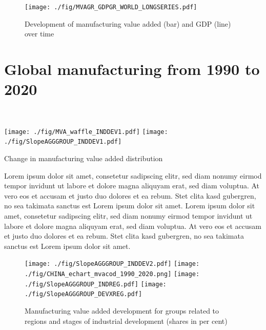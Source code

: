 \documentclass[
  openany, nofonts]{tufte-book}
\begin{document}
\vspace*{\fill}

\begin{figure}
\texttt{[image: ./fig/MVAGR\_GDPGR\_WORLD\_LONGSERIES.pdf]} \caption[Development of MVA (bar) and GDP (line) over time]{Development of manufacturing value added (bar) and GDP (line) over time}\label{fig:c02-LONGSERIES}
\end{figure}

\clearpage\pagebreak

\hypertarget{global-manufacturing-from-1990-to-2020}{%
\section{Global manufacturing from 1990 to 2020}\label{global-manufacturing-from-1990-to-2020}}

~

\begin{marginfigure}
\texttt{[image: ./fig/MVA\_waffle\_INDDEV1.pdf]} \texttt{[image: ./fig/SlopeAGGGROUP\_INDDEV1.pdf]} \caption[Change in MVA distribution]{Change in manufacturing value added distribution}\label{fig:c02-mvadist}
\end{marginfigure}

Lorem ipsum dolor sit amet, consetetur sadipscing elitr, sed diam nonumy eirmod tempor invidunt ut labore et dolore magna aliquyam erat, sed diam voluptua. At vero eos et accusam et justo duo dolores et ea rebum. Stet clita kasd gubergren, no sea takimata sanctus est Lorem ipsum dolor sit amet. Lorem ipsum dolor sit amet, consetetur sadipscing elitr, sed diam nonumy eirmod tempor invidunt ut labore et dolore magna aliquyam erat, sed diam voluptua. At vero eos et accusam et justo duo dolores et ea rebum. Stet clita kasd gubergren, no sea takimata sanctus est Lorem ipsum dolor sit amet.

\vspace*{\fill}

\begin{figure}
\texttt{[image: ./fig/SlopeAGGGROUP\_INDDEV2.pdf]} \texttt{[image: ./fig/CHINA\_echart\_mvacod\_1990\_2020.png]} \texttt{[image: ./fig/SlopeAGGGROUP\_INDREG.pdf]} \texttt{[image: ./fig/SlopeAGGGROUP\_DEVXREG.pdf]} \caption[Manufacturing value added development for selected groups (shares in per cent)]{Manufacturing value added development for groups related to regions and stages of industrial development (shares in per cent)}\label{fig:c02-mvadev}
\end{figure}
\end{document}
